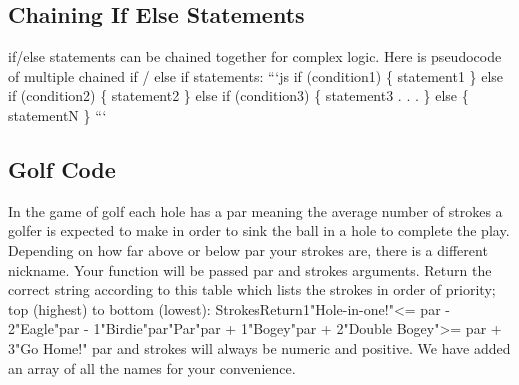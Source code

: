 \documentclass{article}%
\begin{document}
%
\subsection{Chaining If Else Statements}%
\label{subsec:ChainingIfElseStatements}%
if/else statements can be chained together for complex logic. Here is pseudocode of multiple chained if / else if statements:\newline%
```js\newline%
if (condition1) \{\newline%
  statement1\newline%
\} else if (condition2) \{\newline%
  statement2\newline%
\} else if (condition3) \{\newline%
  statement3\newline%
. . .\newline%
\} else \{\newline%
  statementN\newline%
\}\newline%
```\newline%

%
\subsection{Golf Code}%
\label{subsec:GolfCode}%
In the game of golf each hole has a par meaning the average number of strokes a golfer is expected to make in order to sink the ball in a hole to complete the play. Depending on how far above or below par your strokes are, there is a different nickname.\newline%
Your function will be passed par and strokes arguments. Return the correct string according to this table which lists the strokes in order of priority; top (highest) to bottom (lowest):\newline%
StrokesReturn1"Hole{-}in{-}one!"<= par {-} 2"Eagle"par {-} 1"Birdie"par"Par"par + 1"Bogey"par + 2"Double Bogey">= par + 3"Go Home!"\newline%
par and strokes will always be numeric and positive. We have added an array of all the names for your convenience.\newline%

%
\end{document}
